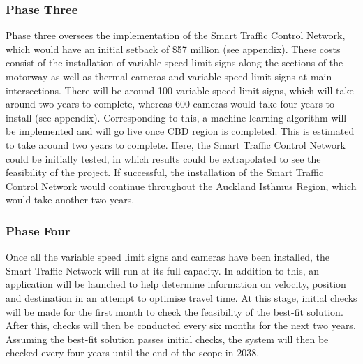 \documentclass[twoside, a4paper, 11pt]{article}
\begin{document}
\subsubsection{Phase Three}
Phase three oversees the implementation of the Smart Traffic Control Network, which would have an initial setback of \$57 million (see appendix). These costs consist of the installation of variable speed limit signs along the sections of the motorway as well as thermal cameras and variable speed limit signs at main intersections. There will be around 100 variable speed limit signs, which will take around two years to complete, whereas 600 cameras would take four years to install (see appendix).  Corresponding to this, a machine learning algorithm will be implemented and will go live once CBD region is completed. This is estimated to take around two years to complete. Here, the Smart Traffic Control Network could be initially tested, in which results could be extrapolated to see the feasibility of the project. If successful, the installation of the Smart Traffic Control Network would continue throughout the Auckland Isthmus Region, which would take another two years.
\subsubsection{Phase Four}
Once all the variable speed limit signs and cameras have been installed, the Smart Traffic Network will run at its full capacity. In addition to this, an application will be launched to help determine information on velocity, position and destination in an attempt to optimise travel time. At this stage, initial checks will be made for the first month to check the feasibility of the best-fit solution. After this, checks will then be conducted every six months for the next two years. Assuming the best-fit solution passes initial checks, the system will then be checked every four years until the end of the scope in 2038.
\end{document}
